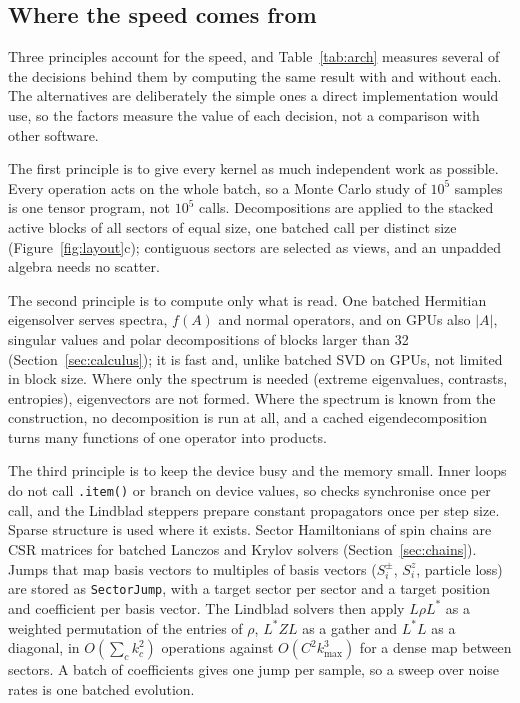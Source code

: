 \documentclass[11pt]{article}
\begin{document}
\subsection{Where the speed comes from}\label{sec:speed}

Three principles account for the speed, and Table~\ref{tab:arch} measures several of the decisions behind them by
computing the same result with and without each. The alternatives are deliberately the simple ones a direct
implementation would use, so the factors measure the value of each decision, not a comparison with other software.

The first principle is to give every kernel as much independent work as possible. Every operation acts on the whole
batch, so a Monte Carlo study of $10^5$ samples is one tensor program, not $10^5$ calls. Decompositions are applied to
the stacked active blocks of all sectors of equal size, one batched call per distinct size
(Figure~\ref{fig:layout}c); contiguous sectors are selected as views, and an unpadded algebra needs no scatter.

The second principle is to compute only what is read. One batched Hermitian eigensolver serves spectra, $f(A)$ and
normal operators, and on GPUs also $|A|$, singular values and polar decompositions of blocks larger than 32
(Section~\ref{sec:calculus}); it is fast and, unlike batched SVD on GPUs, not limited in block size. Where only the spectrum is needed (extreme eigenvalues, contrasts, entropies),
eigenvectors are not formed. Where the spectrum is known from the construction, no decomposition is run at all, and a
cached eigendecomposition turns many functions of one operator into products.

The third principle is to keep the device busy and the memory small. Inner loops do not call \texttt{.item()} or
branch on device values, so checks synchronise once per call, and the Lindblad steppers prepare constant propagators
once per step size. Sparse structure is used where it exists. Sector Hamiltonians of spin chains are CSR matrices for
batched Lanczos and Krylov solvers (Section~\ref{sec:chains}). Jumps that map basis vectors to multiples of basis
vectors ($S^\pm_i$, $S^z_i$, particle loss) are stored as \texttt{SectorJump}, with a target sector per sector and a
target position and coefficient per basis vector. The Lindblad solvers then apply $L\rho L^*$ as a weighted permutation
of the entries of $\rho$, $L^*ZL$ as a gather and $L^*L$ as a diagonal, in $O(\sum_ck_c^2)$ operations against
$O(C^2k_{\max}^3)$ for a dense map between sectors. A batch of coefficients gives one jump per sample, so a sweep over
noise rates is one batched evolution.
\end{document}
